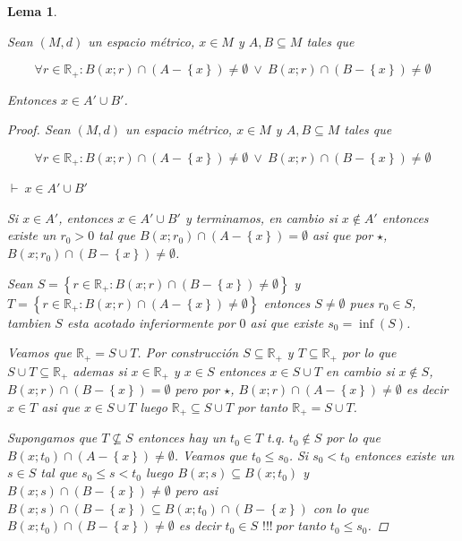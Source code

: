\documentclass[oneside]{book} %
\theoremstyle{Teorema}
\newtheorem{Lema}[Definicion]{Lema}
\theoremstyle{Ejemplos}
\theoremstyle{[Obs]}
\renewcommand{\{}{\left\lbrace} %
\renewcommand{\}}{\right\rbrace} %
\renewcommand{\o}{\ \vee \ } %
\renewcommand{\u}{\cup} %
\newcommand{\n}{\cap} %
\renewcommand{\sc}{\subseteq} %
\newcommand{\R}{\mathbb{R}} %
\newcommand{\pd}{$\vdash\ $} %
\renewcommand{\c}{$!!!\ $} %
\begin{document}
			\begin{Lema}\label{Lema: Para probar union de derivados es derivado de union}\setlength{\parindent}{0em}
			
				Sean $(M, d)$ un espacio métrico, $x \in M$ y $A, B \sc M$ tales que 

				\[ \forall r \in \R_{+} : B(x;r) \n (A - \{ x \}) \neq \emptyset \o B(x;r) \n (B - \{ x \}) \neq \emptyset \]

				Entonces $x \in A' \u B'$.

				\begin{proof}
					
					Sean $(M, d)$ un espacio métrico, $x \in M$ y $A, B \sc M$ tales que

					\begin{equation*}\tag{$\star$}
						\forall r \in \R_{+} : B(x;r) \n (A - \{ x \}) \neq \emptyset \o B(x;r) \n (B - \{ x \}) \neq \emptyset
					\end{equation*}

					\pd $x \in A' \u B'$ 
					
					Si $x \in A'$, entonces $x \in A' \u B'$ y terminamos, en cambio si $x \notin A'$ entonces existe un $r_0 > 0$ tal que $B(x;r_0) \n (A - \{ x \}) = \emptyset$ asi que por $\star$, $B(x;r_0) \n (B - \{ x \}) \neq \emptyset$.

					Sean $S = \{ r \in \R_{+} : B(x;r) \n (B - \{ x \}) \neq \emptyset \}$ y $T = \{ r \in \R_{+} : B(x;r) \n (A - \{ x \}) \neq \emptyset \}$ entonces $S \neq \emptyset$ pues $r_0 \in S$, tambien $S$ esta acotado inferiormente por $0$ asi que existe $s_0 = \inf(S)$. 
					
					Veamos que $\R_{+} = S \u T$. Por construcción $S \sc \R_{+}$ y $T \sc \R_{+}$ por lo que $S \u T \sc \R_{+}$ ademas si $x \in \R_{+}$ y $x \in S$ entonces $x \in S \u T$ en cambio si $x \notin S$, $B(x;r) \n (B - \{ x \}) = \emptyset$ pero por $\star$, $B(x;r) \n (A - \{ x \}) \neq \emptyset$ es decir $x \in T$ asi que $x \in S \u T$ luego $\R_{+} \sc S \u T$ por tanto $\R_{+} = S \u T$.
					
					Supongamos que $T \nsubseteq S$ entonces hay un $t_0 \in T$ t.q. $t_0 \notin S$ por lo que $B(x;t_0) \n (A - \{ x \}) \neq \emptyset$. Veamos que $t_0 \leq s_0$. Si $s_0 < t_0$ entonces existe un $s \in S$ tal que $s_0 \leq s < t_0$ luego $B(x;s) \sc B(x;t_0)$ y $B(x;s) \n (B - \{ x \}) \neq \emptyset$ pero asi $B(x;s) \n (B - \{ x \}) \sc B(x;t_0) \n (B - \{ x \})$ con lo que $B(x;t_0) \n (B - \{ x \}) \neq \emptyset$ es decir $t_0 \in S$ \c por tanto $t_0 \leq s_0$.


\end{proof}
\end{Lema}
\end{document}
